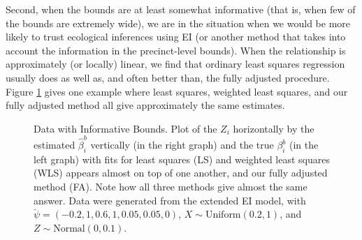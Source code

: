 \documentclass[11pt,titlepage]{article}
\begin{document}
Second, when the bounds are at least somewhat informative (that is,
when few of the bounds are extremely wide), we are in the situation
when we would be more likely to trust ecological inferences using EI
(or another method that takes into account the information in the
precinct-level bounds).  When the relationship is approximately (or
locally) linear, we find that ordinary least squares regression
usually does as well as, and often better than, the fully adjusted
procedure.  Figure \ref{f:narrow} gives one example where least
squares, weighted least squares, and our fully adjusted method all
give approximately the same estimates.
\begin{figure}[t]
  \begin{center}
    \caption{Data with Informative Bounds. Plot of the $Z_i$ horizontally by
      the estimated $\hat\beta_i^b$ vertically (in the right graph)
      and the true $\beta_i^b$ (in the left graph) with fits for least
      squares (LS) and weighted least squares (WLS) appears almost on
      top of one another, and our fully adjusted method (FA).  Note
      how all three methods give almost the same answer. Data were
      generated from the extended EI model, with
      $\breve\psi=(-0.2,1,0.6,1,0.05,0.05,0)$, $X \sim
      \textrm{Uniform}(0.2,1)$, and $Z \sim \textrm{Normal}(0,0.1)$.}
    \label{f:narrow}
  \end{center}
\end{figure}
\end{document}
